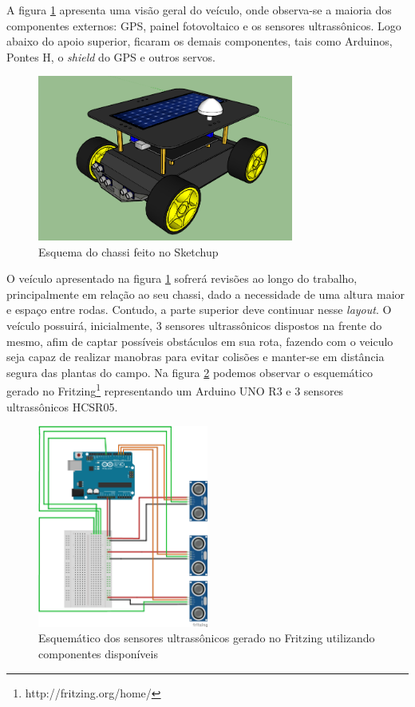 A figura \ref{fig:sketchup:vaa} apresenta uma visão geral do veículo, onde observa-se a maioria dos componentes externos: GPS, painel fotovoltaico e os sensores ultrassônicos. Logo abaixo do apoio superior, ficaram os demais componentes, tais como Arduinos, Pontes H, o \textit{shield} do GPS e outros servos. 
\begin{figure}[H]
    \centering
    \includegraphics[width=0.75\textwidth]{figuras/chassi_vaa_completo.png}
    \caption{Esquema do chassi feito no Sketchup}
    \label{fig:sketchup:vaa}
\end{figure}
O veículo apresentado na figura \ref{fig:sketchup:vaa} sofrerá revisões ao longo do trabalho, principalmente em relação ao seu chassi, dado a necessidade de uma altura maior e espaço entre rodas. Contudo, a parte superior deve continuar nesse \textit{layout}.
O veículo possuirá, inicialmente, 3 sensores ultrassônicos dispostos na frente do mesmo, afim de captar possíveis obstáculos em sua rota, fazendo com o veiculo seja capaz de realizar manobras para evitar colisões e manter-se em distância segura das plantas do campo. Na figura \ref{fig:ultrasonico:vaa} podemos observar o esquemático gerado no Fritzing\footnote{http://fritzing.org/home/} representando um Arduino UNO R3 e 3 sensores ultrassônicos HCSR05.
\begin{figure}[H]
    \centering
    \includegraphics[width=0.5\textwidth]{figuras/ultrassonico_bb.png}
    \caption{Esquemático dos sensores ultrassônicos gerado no Fritzing utilizando componentes disponíveis}
    \label{fig:ultrasonico:vaa}
\end{figure}

